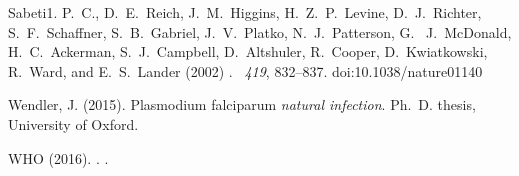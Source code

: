 \documentclass{bioinfo}
\begin{document}
\begin{thebibliography}{}
Sabeti1. P.~C., D.~E.~Reich, J.~M.~Higgins, H.~Z.~P.~Levine, D.~J.~Richter, S.~F.~Schaffner, S.~B.~Gabriel, J.~V.~Platko, N.~J.~Patterson, G.~ J.~McDonald, H.~C.~Ackerman, S.~J.~Campbell, D.~Altshuler, R.~Cooper, D.~Kwiatkowski, R.~Ward, and E.~S.~Lander (2002)
.
~{\em 419\/}, 832--837. doi:10.1038/nature01140

Wendler, J. (2015).
 {P}lasmodium falciparum {\em natural infection}.
\newblock Ph.\ D. thesis, University of Oxford.

WHO (2016).
.
.

\end{thebibliography}
\end{document}
